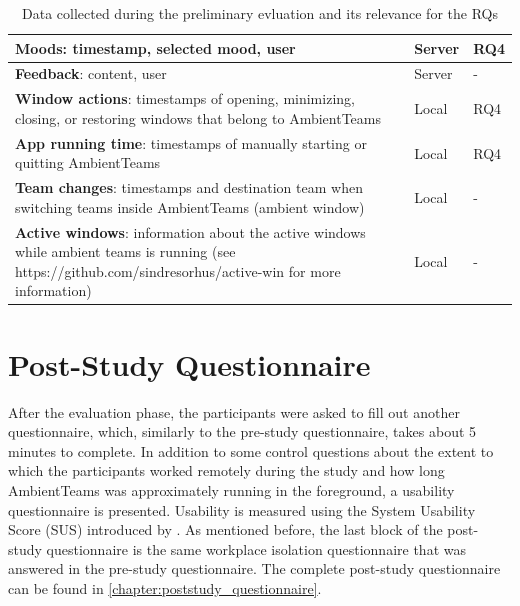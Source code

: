 \begin{table}[h]
\begin{tabular}{|p{8cm}|p{1cm}|p{2cm}|}
        \hline
        \textbf{Moods}: timestamp, selected mood, user                                                                                                                     & Server  & RQ4       \\
        \hline
        \textbf{Feedback}: content, user                                                                                                                                   & Server  & -         \\
        \hline
        \textbf{Window actions}:  timestamps of opening, minimizing, closing, or restoring windows that belong to AmbientTeams                                             & Local   & RQ4       \\
        \hline
        \textbf{App running time}:  timestamps of manually starting or quitting AmbientTeams                                                                               & Local   & RQ4       \\
        \hline
        \textbf{Team changes}: timestamps and destination team when switching teams inside AmbientTeams (ambient window)                                                   & Local   & -         \\
        \hline
        \textbf{Active windows}: information about the active windows while ambient teams is running (see https://github.com/sindresorhus/active-win for more information) & Local   & -         \\
        \hline
    \end{tabular}
    \caption{Data collected during the preliminary evluation and its relevance for the RQs}
    \label{table:data}
\end{table}


\section{Post-Study Questionnaire}
\label{section:poststudy_questionnaire}
After the evaluation phase, the participants were asked to fill out another questionnaire, which, similarly to the pre-study questionnaire, takes about 5 minutes to complete. In addition to some control questions about the extent to which the participants worked remotely during the study and how long AmbientTeams was approximately running in the foreground, a usability questionnaire is presented. Usability is measured using the System Usability Score (SUS) introduced by \textcite{brooke1996sus}. As mentioned before, the last block of the post-study questionnaire is the same workplace isolation questionnaire that was answered in the pre-study questionnaire. The complete post-study questionnaire can be found in \autoref{chapter:poststudy_questionnaire}.

